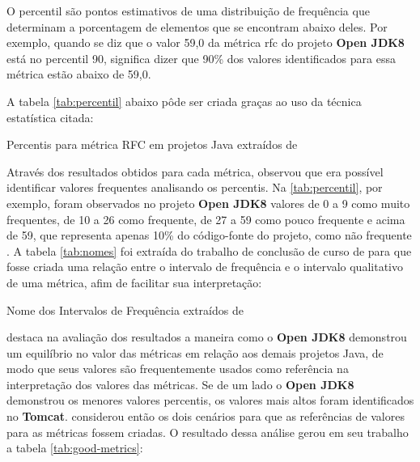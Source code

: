 O percentil são pontos estimativos de uma distribuição de frequência que determinam a porcentagem de elementos que se encontram abaixo deles. Por exemplo, quando se diz que o valor 59,0 da métrica rfc do projeto \textbf{Open JDK8} está no percentil 90, significa dizer que 90\% dos valores identificados para essa métrica estão abaixo de 59,0. 

A tabela \ref{tab:percentil} abaixo pôde ser criada graças ao uso da técnica estatística citada:
	
	\begin{table}[!ht]
	\begin{center}
	
	 
	\caption{Percentis para métrica RFC em projetos Java extraídos de  
	}
	\label{tab:percentil}
	\end{center}
	\end{table}	
	\FloatBarrier	

Através dos resultados obtidos para cada métrica,  observou que era possível identificar valores frequentes analisando os percentis. Na \ref{tab:percentil}, por exemplo, foram observados no projeto \textbf{Open JDK8} valores de 0 a 9 como muito frequentes, de 10 a 26 como frequente, de 27 a 59 como pouco frequente e acima de 59, que representa apenas 10\% do código-fonte do projeto, como não frequente \cite{Meirelles2013}. A tabela \ref{tab:nomes} foi extraída do trabalho de conclusão de curso de  para que fosse criada uma relação entre o intervalo de frequência e o intervalo qualitativo de uma métrica, afim de facilitar sua interpretação:

\begin{table}[!ht]
	\begin{center}
	
	\caption{Nome dos Intervalos de Frequência extraídos de }
	\label{tab:nomes}
	\end{center}
	\end{table}
	\FloatBarrier
	
	 
 destaca na avaliação dos resultados a maneira como o \textbf{Open JDK8} demonstrou um equilíbrio no valor das métricas em relação aos demais projetos Java, de modo que seus valores são frequentemente usados como referência na interpretação dos valores das métricas. Se de um lado o  \textbf{Open JDK8} demonstrou os menores valores percentis, os valores mais altos foram identificados no \textbf{Tomcat}.  considerou então os dois cenários para que as referências de valores para as métricas fossem criadas. O resultado dessa análise gerou em seu trabalho a tabela \ref{tab:good-metrics}:

